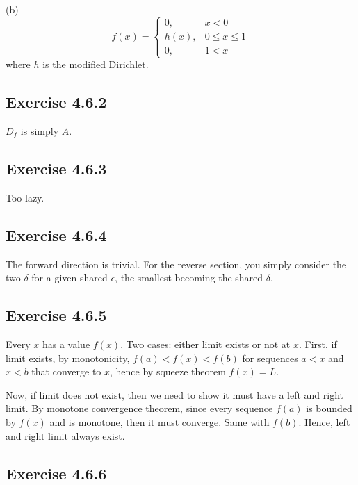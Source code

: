 \documentclass{book}
\begin{document}
\noindent
(b)
$$f(x) = \begin{cases}
    0, & x < 0 \\
    h(x), & 0 \leq x \leq 1 \\
    0, & 1 < x
\end{cases}$$
where $h$ is the modified Dirichlet.

\subsection*{Exercise 4.6.2}
$D_f$ is simply $A$.

\subsection*{Exercise 4.6.3}
Too lazy.

\subsection*{Exercise 4.6.4}
The forward direction is trivial. For the reverse section, you simply consider the two $\delta$ for a given shared $\epsilon$, the smallest becoming the shared $\delta$.

\subsection*{Exercise 4.6.5}
Every $x$ has a value $f(x)$. Two cases: either limit exists or not at $x$. First, if limit exists, by monotonicity, $f(a) < f(x) < f(b)$ for sequences $a < x$ and $x < b$ that converge to $x$, hence by squeeze theorem $f(x) = L$.

Now, if limit does not exist, then we need to show it must have a left and right limit. By monotone convergence theorem, since every sequence $f(a)$ is bounded by $f(x)$ and is monotone, then it must converge. Same with $f(b)$. Hence, left and right limit always exist.

\subsection*{Exercise 4.6.6}
\end{document}
